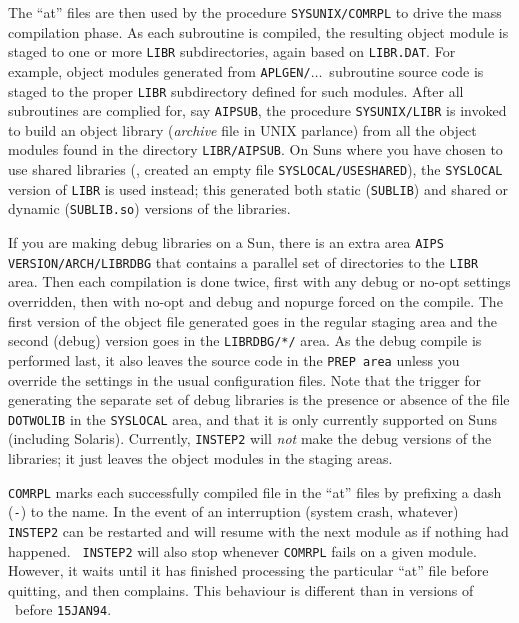 The ``at'' files are then used by the procedure {\tt\dol SYSUNIX/COMRPL}
to drive the mass compilation phase.  As each subroutine is compiled,
the resulting object module is staged to one or more {\tt\dol LIBR}
subdirectories, again based on {\tt LIBR.DAT}.  For example, object
modules generated from {\tt\dol APLGEN/}$\dots$\ subroutine source code
is staged to the proper {\tt\dol LIBR} subdirectory defined for such
modules.  After all subroutines are complied for, say {\tt\dol AIPSUB},
the procedure {\tt\dol SYSUNIX/LIBR} is invoked to build an object
library ({\it archive\/} file in UNIX parlance) from all the object
modules found in the directory {\tt\dol LIBR/AIPSUB}.  On Suns where you
have chosen to use shared libraries (\ie, created an empty file
{\tt\dol SYSLOCAL/USESHARED}), the {\tt\dol SYSLOCAL} version of {\tt LIBR}
is used instead; this generated both static ({\tt SUBLIB}) and shared
or dynamic ({\tt SUBLIB.so}) versions of the libraries.

If you are making debug libraries on a Sun, there is an extra area
{\tt\dol AIPS VERSION/\dol ARCH/LIBR\-DBG} that contains a parallel set of
directories to the {\tt\dol LIBR} area.  Then each compilation is done twice,
first with any debug or no-opt settings overridden, then with no-opt and
debug and nopurge forced on the compile.  The first version of the object
file generated goes in the regular staging area and the second (debug)
version goes in the {\tt LIBRDBG/*/} area.  As the debug compile is
performed last, it also leaves the source code in the {\tt\dol PREP area}
unless you override the settings in the usual configuration files.  Note
that the trigger for generating the separate set of debug libraries is the
presence or absence of the file {\tt DOTWOLIB} in the {\tt\dol SYSLOCAL}
area, and that it is only currently supported on Suns (including Solaris).
Currently, {\tt INSTEP2} will {\it not\/} make the debug versions of the
libraries; it just leaves the object modules in the staging areas.

{\tt COMRPL} marks each successfully compiled file in the ``at'' files
by prefixing a dash ({\tt -}) to the name.  In the event of an
interruption (system crash, whatever) {\tt INSTEP2} can be restarted and
will resume with the next module as if nothing had happened.  {\tt
INSTEP2} will also stop whenever {\tt COMRPL} fails on a given module.
However, it waits until it has finished processing the particular ``at''
file before quitting, and then complains.  This behaviour is different
than in versions of \AIPS\ before {\tt 15JAN94}.


